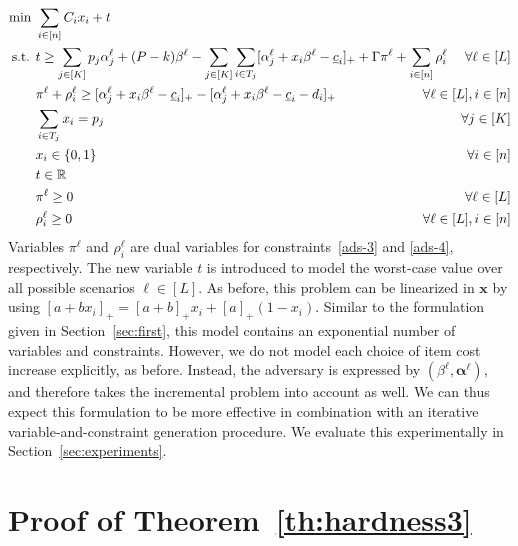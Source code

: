 \begin{subequations}
\label{eq:secmod}  
\begin{align}
\min\ & \sum_{i\in[n]} C_i x_i + t \label{secmod-1} \\
\text{s.t. } & t \ge \sum_{j\in[K]} p_j\alpha^{\ell}_j + (P-k)\beta^{\ell} - \sum_{j\in[K]} \sum_{i\in T_j} [\alpha^{\ell}_j + x_i\beta^{\ell} - \underline{c}_i]_+ + \Gamma\pi^{\ell} + \sum_{i\in[n]} \rho^{\ell}_i \hspace*{-10mm}& \forall {\ell}\in[L] \\
& \pi^{\ell} + \rho^{\ell}_i \ge [\alpha^{\ell}_j + x_i\beta^{\ell} - \underline{c}_i]_+ - [\alpha^{\ell}_j + x_i \beta^{\ell} - \underline{c}_i - d_i]_+ & \forall {\ell}\in[L], i\in[n] \\
& \sum_{i\in T_j} x_i = p_j & \forall j\in[K] \\
& x_i \in\{0,1\} & \forall i\in[n] \\
& t \in \rr \\
& \pi^{\ell} \ge 0 & \forall {\ell} \in[L] \\
& \rho^{\ell}_i \ge 0 & \forall {\ell} \in[L],i\in[n] \label{secmod-end}
\end{align}
\end{subequations}
Variables $\pi^{\ell}$ and $\rho^{\ell}_i$ are dual variables for constraints~\eqref{ads-3} and \eqref{ads-4}, respectively. The new variable $t$ is introduced to model the worst-case value over all possible scenarios $\ell \in[L]$. As before, this problem can be linearized in $\pmb{x}$ by using $[a+bx_i]_+ = [a+b]_+ x_i + [a]_+(1-x_i)$. Similar to the formulation given in Section~\ref{sec:first}, this model contains an exponential number of variables and constraints. However, we do not model each choice of item cost increase explicitly, as before. Instead, the adversary is expressed by $(\beta^{\ell},\pmb{\alpha}^{\ell})$, and therefore takes the incremental problem into account as well. We can thus expect this formulation to be more effective in combination with an iterative variable-and-constraint generation procedure. We evaluate this experimentally in Section~\ref{sec:experiments}.








\section{Proof of Theorem~\ref{th:hardness3}}
\label{sec:two-stage-selection-hardness}

